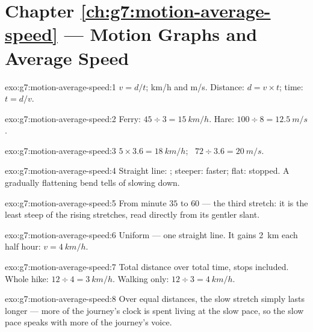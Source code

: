 \section*{Chapter \ref{ch:g7:motion-average-speed} --- Motion Graphs and Average Speed}

\begin{solution}{exo:g7:motion-average-speed:1}
$v = d/t$;  \unit{km/h} and \unit{m/s}. Distance:
$d = v \times t$; time: $t = d/v$.
\end{solution}

\begin{solution}{exo:g7:motion-average-speed:2}
Ferry: $45 \div 3 = \qty{15}{km/h}$. Hare: $100 \div 8 =
\qty{12.5}{m/s}$.
\end{solution}

\begin{solution}{exo:g7:motion-average-speed:3}
$5 \times 3.6 = \qty{18}{km/h}$; \ $72 \div 3.6 = \qty{20}{m/s}$.
\end{solution}

\begin{solution}{exo:g7:motion-average-speed:4}
Straight line: ; steeper: faster; flat: stopped. A
gradually flattening bend tells of slowing down.
\end{solution}

\begin{solution}{exo:g7:motion-average-speed:5}
From minute $35$ to $60$ --- the third stretch: it is the least
steep of the rising stretches, read directly from its gentler
slant.
\end{solution}

\begin{solution}{exo:g7:motion-average-speed:6}
Uniform --- one straight line. It gains \qty{2}{km} each half
hour: $v = \qty{4}{km/h}$.
\end{solution}

\begin{solution}{exo:g7:motion-average-speed:7}
Total distance over total time, stops included. Whole hike:
$12 \div 4 = \qty{3}{km/h}$. Walking only: $12 \div 3 =
\qty{4}{km/h}$.
\end{solution}

\begin{solution}{exo:g7:motion-average-speed:8}
Over equal distances, the slow stretch simply lasts longer ---
more of the journey's clock is spent living at the slow pace, so
the slow pace speaks with more of the journey's voice.
\end{solution}


